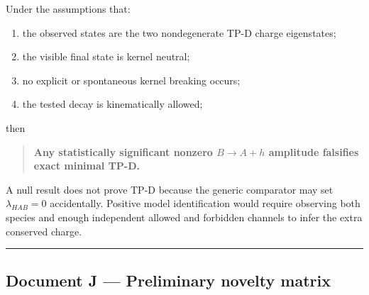 \documentclass[
]{article}
\providecommand{\tightlist}{%
  \setlength{\itemsep}{0pt}\setlength{\parskip}{0pt}}
\begin{document}
Under the assumptions that:

\begin{enumerate}
\def\labelenumi{\arabic{enumi}.}
\tightlist
\item
  the observed states are the two nondegenerate TP-D charge eigenstates;
\item
  the visible final state is kernel neutral;
\item
  no explicit or spontaneous kernel breaking occurs;
\item
  the tested decay is kinematically allowed;
\end{enumerate}

then

\begin{quote}
\textbf{Any statistically significant nonzero \(B\to A+h\) amplitude
falsifies exact minimal TP-D.}
\end{quote}

A null result does not prove TP-D because the generic comparator may set
\(\lambda_{HAB}=0\) accidentally. Positive model identification would
require observing both species and enough independent allowed and
forbidden channels to infer the extra conserved charge.

\begin{center}\rule{0.5\linewidth}{0.5pt}\end{center}

\hypertarget{document-j-preliminary-novelty-matrix}{%
\subsection{Document J --- Preliminary novelty
matrix}\label{document-j-preliminary-novelty-matrix}}
\end{document}
